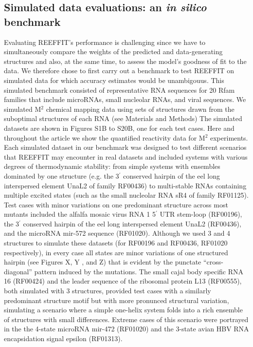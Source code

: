 \documentclass[12pt]{article}
\begin{document}
\subsection{Simulated data evaluations: an \textit{in silico} benchmark}
Evaluating REEFFIT's performance is challenging since we have to simultaneously compare the weights of the predicted and data-generating structures and also, at the same time, to assess the model's goodness of fit to the data. 
We therefore chose to first carry out a benchmark to test REEFFIT on simulated data for which accuracy estimates would be unambigouus. 
This simulated benchmark consisted of representative RNA sequences for 20 Rfam families \cite{Gardner2011} that include microRNAs, small nucleolar RNAs, and viral sequences. 
We simulated M$^2$ chemical mapping data using sets of structures drawn from the suboptimal structures of each RNA (see Materials and Methods)
The simulated datasets are shown in Figures S1B to S20B, one for each test cases.
Here and throughout the article we show the quantified reactivity data for M$^2$ experiments.  
Each simulated dataset in our benchmark was designed to test different scenarios that REEFFIT may encounter in real datasets and included systems with various degrees of thermodynamic stability: from simple systems with ensembles dominated by one structure (e.g. the 3$^{\prime}$ conserved hairpin of the eel long interspersed element UnaL2 of family RF00436) to multi-stable RNAs containing multiple excited states (such as the small nucleolar RNA sR4 of family RF01125).
Test cases with minor variations on one predominant structure across most mutants included the alfalfa mosaic virus RNA 1 5$^{\prime}$ UTR stem-loop (RF00196), the 3$^{\prime}$ conserved hairpin of the eel long interspersed element UnaL2 (RF00436), and the microRNA mir-572 sequence (RF01020).
Although we used 3 and 4 structures to simulate these datasets (for RF00196 and RF00436, RF01020 respectively), in every case all states are minor variations of one structured hairpin (see Figures X, Y , and Z) that is evident by the punctate ``cross-diagonal'' pattern induced by the mutations.
The small cajal body specific RNA 16 (RF00424) and  the leader sequence of the ribosomal protein L13 (RF00555), both simulated with 3 structures, provided test cases with a similarly predominant structure motif but with more pronunced structural variation, simulating a scenario where a simple one-helix system folds into a rich ensemble of structures with small differences.
Extreme cases of this scenario were portrayed in the the 4-state microRNA mir-472 (RF01020) and the 3-state avian HBV RNA encapsidation signal epsilon (RF01313).
\end{document}
